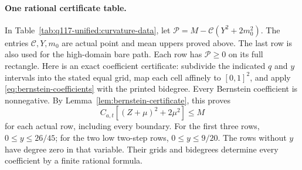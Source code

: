\paragraph{One rational certificate table.}
In Table~\ref{tab:q117-unified:curvature-data}, let
\(\mathcal P=M-\mathcal C(Y^2+2m_0^2)\).
The entries \(\mathcal C,Y,m_0\) are actual point and mean
uppers proved above. The last row is also used for the high-domain
bare path. Each row has \(\mathcal P\ge0\) on its full rectangle.
Here is an exact coefficient certificate: subdivide the indicated
\(q\) and \(y\) intervals into the stated equal grid, map each
cell affinely to \([0,1]^2\), and apply
\eqref{eq:bernstein-coefficients} with the printed bidegree.
Every Bernstein coefficient is nonnegative. By
Lemma~\ref{lem:bernstein-certificate}, this proves
\begin{equation}\label{eq:q117-unified:coefficient-bound}
 C_{a,t}[(Z+\mu)^2+2\mu^2]\le M
\end{equation}
for each actual row, including every boundary.
For the first three rows, \(0\le y\le26/45\); for the two
low two-step rows, \(0\le y\le9/20\).
The rows without \(y\) have degree zero in that variable.
Their grids and bidegrees determine every coefficient by a finite rational formula.

